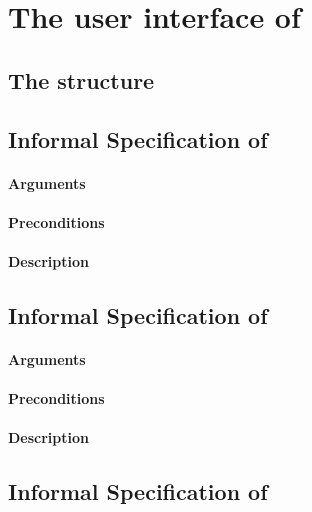 

\section{The user interface of \bitwalker}

\subsection{The structure }

\subsection{Informal Specification of }

\paragraph{Arguments}

\paragraph{Preconditions}

\paragraph{Description}

\subsection{Informal Specification of }

\paragraph{Arguments}

\paragraph{Preconditions}

\paragraph{Description}

\subsection{Informal Specification of }

